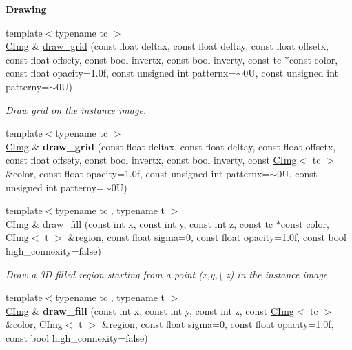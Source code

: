 \begin{Indent}{\bf Drawing}
\begin{DoxyCompactItemize}
\item 
\hypertarget{structcimg__library_1_1_c_img_afc006e53ed308a776803d07d66eb5af8}{{\footnotesize template$<$typename tc $>$ }\\\hyperlink{structcimg__library_1_1_c_img}{C\-Img} \& \hyperlink{structcimg__library_1_1_c_img_afc006e53ed308a776803d07d66eb5af8}{draw\-\_\-grid} (const float deltax, const float deltay, const float offsetx, const float offsety, const bool invertx, const bool inverty, const tc $\ast$const color, const float opacity=1.\-0f, const unsigned int patternx=$\sim$0\-U, const unsigned int patterny=$\sim$0\-U)}\label{structcimg__library_1_1_c_img_afc006e53ed308a776803d07d66eb5af8}

\begin{DoxyCompactList}\small\item\em Draw grid on the instance image. \end{DoxyCompactList}\item 
\hypertarget{structcimg__library_1_1_c_img_a3bc267e8233f8ee84d2338e6267129a2}{{\footnotesize template$<$typename tc $>$ }\\\hyperlink{structcimg__library_1_1_c_img}{C\-Img} \& {\bfseries draw\-\_\-grid} (const float deltax, const float deltay, const float offsetx, const float offsety, const bool invertx, const bool inverty, const \hyperlink{structcimg__library_1_1_c_img}{C\-Img}$<$ tc $>$ \&color, const float opacity=1.\-0f, const unsigned int patternx=$\sim$0\-U, const unsigned int patterny=$\sim$0\-U)}\label{structcimg__library_1_1_c_img_a3bc267e8233f8ee84d2338e6267129a2}

\item 
{\footnotesize template$<$typename tc , typename t $>$ }\\\hyperlink{structcimg__library_1_1_c_img}{C\-Img} \& \hyperlink{structcimg__library_1_1_c_img_a2c01ad505b191c9ca94f1847f3493965}{draw\-\_\-fill} (const int x, const int y, const int z, const tc $\ast$const color, \hyperlink{structcimg__library_1_1_c_img}{C\-Img}$<$ t $>$ \&region, const float sigma=0, const float opacity=1.\-0f, const bool high\-\_\-connexity=false)
\begin{DoxyCompactList}\small\item\em Draw a 3\-D filled region starting from a point ({\ttfamily x},{\ttfamily y},\textbackslash{} z) in the instance image. \end{DoxyCompactList}\item 
\hypertarget{structcimg__library_1_1_c_img_a75d6ea58c508c4a5470331af708bf74e}{{\footnotesize template$<$typename tc , typename t $>$ }\\\hyperlink{structcimg__library_1_1_c_img}{C\-Img} \& {\bfseries draw\-\_\-fill} (const int x, const int y, const int z, const \hyperlink{structcimg__library_1_1_c_img}{C\-Img}$<$ tc $>$ \&color, \hyperlink{structcimg__library_1_1_c_img}{C\-Img}$<$ t $>$ \&region, const float sigma=0, const float opacity=1.\-0f, const bool high\-\_\-connexity=false)}\label{structcimg__library_1_1_c_img_a75d6ea58c508c4a5470331af708bf74e}


\end{DoxyCompactItemize}
\end{Indent}
